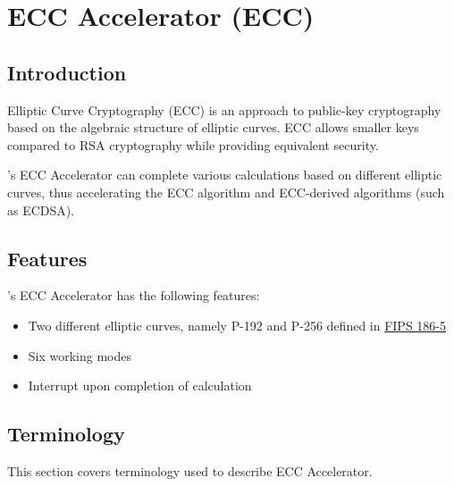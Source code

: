 \documentclass[main\_\_EN.tex]{subfiles}
\begin{document}

\ifglobal
\else
    {\let\clearpage\relax \listoftodos}
    {\let\clearpage\relax \listofdonetodos}
    \tableofcontents
    \listoftables
    \listoffigures
\fi



\hypertarget{ecc}{}
\chapter{ECC Accelerator (ECC)}
\label{mod:ecc}


\section{Introduction}

Elliptic Curve Cryptography (ECC) is an approach to public-key cryptography based on the algebraic structure of elliptic curves. ECC allows smaller keys compared to RSA cryptography while providing equivalent security.

\chipname{}'s ECC Accelerator can complete various calculations based on different elliptic curves, thus accelerating the ECC algorithm and ECC-derived algorithms (such as ECDSA).

\section{Features}
\chipname{}'s ECC Accelerator has the following features:
\begin{itemize}
    \item Two different elliptic curves, namely P-192 and P-256 defined in \href{https://nvlpubs.nist.gov/nistpubs/FIPS/NIST.FIPS.186-5.pdf}{FIPS 186-5}
    \item Six working modes
    \item Interrupt upon completion of calculation
\end{itemize}

\section{Terminology}
This section covers terminology used to describe ECC Accelerator.
\end{document}
